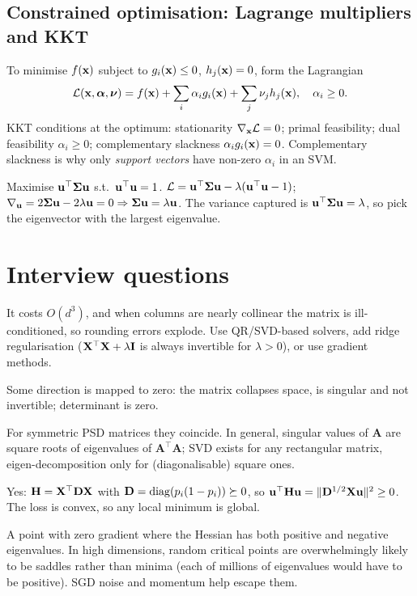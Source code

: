 \subsection{Constrained optimisation: Lagrange multipliers and KKT}
To minimise $f(\mathbf{x})$ subject to $g_i(\mathbf{x})\le0$, $h_j(\mathbf{x})=0$, form the Lagrangian
\[\mathcal{L}(\mathbf{x},\bm\alpha,\bm\nu)=f(\mathbf{x})+\sum_i\alpha_ig_i(\mathbf{x})+\sum_j\nu_jh_j(\mathbf{x}),\quad\alpha_i\ge0.\]
KKT conditions at the optimum: stationarity $\nabla_{\mathbf{x}}\mathcal{L}=0$; primal feasibility; dual feasibility $\alpha_i\ge0$; complementary slackness $\alpha_ig_i(\mathbf{x})=0$. Complementary slackness is why only \emph{support vectors} have non-zero $\alpha_i$ in an SVM.

\begin{example}
Maximise $\mathbf{u}^\top\bm{\Sigma}\mathbf{u}$ s.t.\ $\mathbf{u}^\top\mathbf{u}=1$. $\mathcal{L}=\mathbf{u}^\top\bm{\Sigma}\mathbf{u}-\lambda(\mathbf{u}^\top\mathbf{u}-1)$; $\nabla_{\mathbf{u}}=2\bm{\Sigma}\mathbf{u}-2\lambda\mathbf{u}=0\Rightarrow\bm{\Sigma}\mathbf{u}=\lambda\mathbf{u}$. The variance captured is $\mathbf{u}^\top\bm{\Sigma}\mathbf{u}=\lambda$, so pick the eigenvector with the largest eigenvalue.
\end{example}

\section{Interview questions}
\A It costs $O(d^3)$, and when columns are nearly collinear the matrix is ill-conditioned, so rounding errors explode. Use QR/SVD-based solvers, add ridge regularisation ($\mathbf{X}^\top\mathbf{X}+\lambda\mathbf{I}$ is always invertible for $\lambda>0$), or use gradient methods.

\A Some direction is mapped to zero: the matrix collapses space, is singular and not invertible; determinant is zero.

\A For symmetric PSD matrices they coincide. In general, singular values of $\mathbf{A}$ are square roots of eigenvalues of $\mathbf{A}^\top\mathbf{A}$; SVD exists for any rectangular matrix, eigen-decomposition only for (diagonalisable) square ones.

\A Yes: $\mathbf{H}=\mathbf{X}^\top\mathbf{D}\mathbf{X}$ with $\mathbf{D}=\operatorname{diag}(p_i(1-p_i))\succeq0$, so $\mathbf{u}^\top\mathbf{H}\mathbf{u}=\|\mathbf{D}^{1/2}\mathbf{X}\mathbf{u}\|^2\ge0$. The loss is convex, so any local minimum is global.

\A A point with zero gradient where the Hessian has both positive and negative eigenvalues. In high dimensions, random critical points are overwhelmingly likely to be saddles rather than minima (each of millions of eigenvalues would have to be positive). SGD noise and momentum help escape them.

